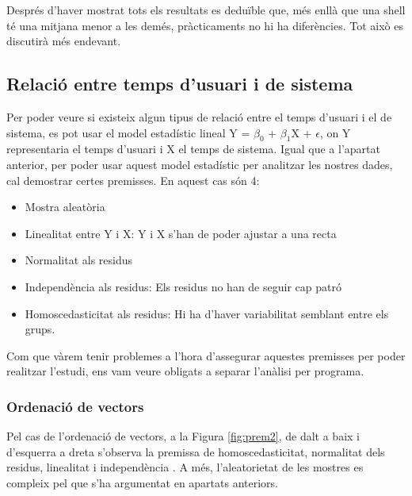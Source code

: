 \documentclass[12pt]{article}
\begin{document}
Després d'haver mostrat tots els resultats es deduïble que, més enllà que una shell té una mitjana menor a les demés,
pràcticaments no hi ha diferències. Tot això es discutirà més endevant.

\subsection{Relació entre temps d'usuari i de sistema}
Per poder veure si existeix algun tipus de relació entre el temps d'usuari i el de sistema, es pot usar el model estadístic
lineal Y = $\beta_{0}$ + $\beta_{1}$X + $\epsilon$, on Y representaria el temps d'usuari i X el temps de sistema. Igual que a l'apartat
anterior, per poder usar aquest model estadístic per analitzar les nostres dades, cal demostrar certes premisses. En aquest cas
són 4: 
\begin{itemize}
  \item Mostra aleatòria
  \item Linealitat entre Y i X: Y i X s'han de poder ajustar a una recta
  \item Normalitat als residus
  \item Independència als residus: Els residus no han de seguir cap patró
  \item Homoscedasticitat als residus: Hi ha d'haver variabilitat semblant entre els grups.
\end{itemize}

Com que vàrem tenir problemes a l'hora d'assegurar aquestes premisses per poder realitzar l'estudi, ens vam veure obligats a separar l'anàlisi
per programa. 

\subsubsection{Ordenació de vectors}
Pel cas de l'ordenació de vectors, a la Figura \ref{fig:prem2}, de dalt a baix i d'esquerra a dreta s'observa la premissa
de homoscedasticitat, normalitat dels residus, linealitat i independència . A més, l'aleatorietat de les mostres es compleix pel que s'ha 
argumentat en apartats anteriors.
\end{document}

